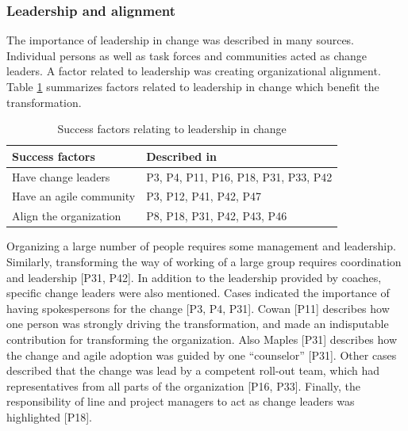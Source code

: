 \documentclass[preprint,authoryear,12pt]{elsarticle}
\begin{document}
\subsubsection{Leadership and alignment}

The importance of leadership in change was described in many sources. Individual
persons as well as task forces and communities acted as change leaders. A factor
related to leadership was creating organizational alignment.
Table \ref{table:success_changeleaders} summarizes factors related to leadership
in change which benefit the transformation.

\begin{table}[h]
    \centering
    \begin{tabular}{ >{\raggedright\arraybackslash}p{}
                     >{\raggedright\arraybackslash}p{} }
        \toprule
        Success factors  &  Described in \\
        \midrule
        Have change leaders  &
                P3, P4, P11, P16, P18, P31, P33, P42  \\
        Have an agile community  &
                P3, P12, P41, P42, P47  \\
        Align the organization  &
                P8, P18, P31, P42, P43, P46  \\
        \bottomrule
    \end{tabular}
    \caption{Success factors relating to leadership in change}
    \label{table:success_changeleaders}
\end{table}


Organizing a large number of people requires some management and leadership.
Similarly, transforming the way of working of a large group requires coordination
and leadership [P31, P42]. In addition to the leadership provided by coaches,
specific change leaders were also mentioned. Cases indicated the importance of
having spokespersons for the change [P3, P4, P31]. Cowan [P11] describes how one
person was strongly driving the transformation, and made an indisputable
contribution for transforming the organization. Also Maples [P31] describes how
the change and agile adoption was guided by one ``counselor'' [P31]. Other cases
described that the change was lead by a competent roll-out team, which had
representatives from all parts of the organization [P16, P33]. Finally, the
responsibility of line and project managers to act as change leaders was
highlighted [P18].
\end{document}
